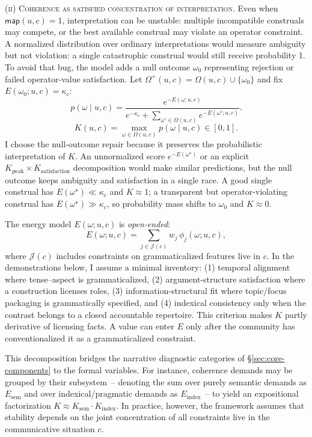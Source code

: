 \documentclass[12pt,letterpaper]{article}
\begin{document}
\textsc{(ii) Coherence as satisfied concentration of interpretation.}
Even when $\mathsf{map}(u,c)=1$, interpretation can be unstable: multiple
incompatible construals may compete, or the best available construal may violate
an operator constraint. A normalized distribution over ordinary interpretations
would measure ambiguity but not violation: a single catastrophic construal would
still receive probability 1. To avoid that bug, the model adds a null outcome
$\omega_0$ representing rejection or failed operator-value satisfaction. Let
$\Omega^+(u,c)=\Omega(u,c)\cup\{\omega_0\}$ and fix
$E(\omega_0;u,c)=\kappa_c$:
$$
p(\omega\mid u,c)=
\frac{e^{-E(\omega;u,c)}}{e^{-\kappa_c}+\sum_{\omega'\in\Omega(u,c)}
e^{-E(\omega';u,c)}}.
$$
$$
K(u,c)=\max_{\omega\in\Omega(u,c)} p(\omega\mid u,c)\in[0,1].
$$
I choose the null-outcome repair because it preserves the probabilistic
interpretation of $K$. An unnormalized score $e^{-E(\omega^\star)}$ or an
explicit $K_{\text{peak}}\times K_{\text{satisfaction}}$ decomposition would
make similar predictions, but the null outcome keeps ambiguity and
satisfaction in a single race. A good single construal has $E(\omega^\star)\ll
\kappa_c$ and $K\approx 1$; a transparent but operator-violating construal has
$E(\omega^\star)\gg\kappa_c$, so probability mass shifts to $\omega_0$ and
$K\approx 0$.

The energy model $E(\omega;u,c)$ is \emph{open-ended}:
\begin{equation*}
E(\omega;u,c)=\sum_{j\in\mathcal{J}(c)} w_j\,\phi_j(\omega;u,c),
\end{equation*}
where $\mathcal{J}(c)$ includes constraints on grammaticalized features live in
$c$. In the demonstrations below, I assume a minimal inventory: (1) temporal
alignment where tense--aspect is grammaticalized, (2) argument-structure
satisfaction where a construction licenses roles, (3) information-structural
fit where topic/focus packaging is grammatically specified, and (4) indexical
consistency only when the contrast belongs to a closed accountable repertoire.
This criterion makes $K$ partly derivative of licensing facts. A value can
enter $E$ only after the community has conventionalized it as a grammaticalized
constraint.

This decomposition bridges the narrative diagnostic categories of \S\ref{sec:core-components} to the formal variables. For instance, coherence demands may be grouped by their subsystem~-- denoting the sum over purely semantic demands as $E_{\text{sem}}$ and over indexical/pragmatic demands as $E_{\text{index}}$~-- to yield an expositional factorization $K \approx K_{\text{sem}} \cdot K_{\text{index}}$. In practice, however, the framework assumes that stability depends on the joint concentration of all constraints live in the communicative situation $c$.
\end{document}

